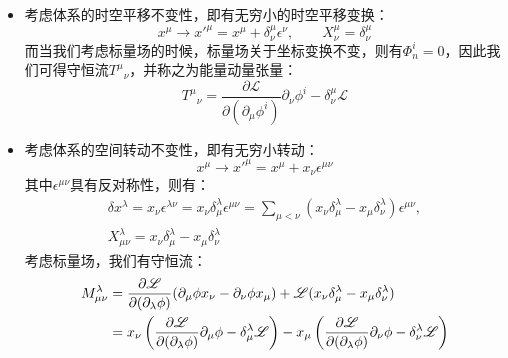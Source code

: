 \begin{itemize}
	\item 考虑体系的时空平移不变性，即有无穷小的时空平移变换：
	\begin{equation}
		x^\mu\rightarrow x'^\mu=x^\mu+\delta^\mu_\nu\epsilon^\nu,\qquad X^\mu_\nu=\delta^\mu_\nu
	\end{equation}
	而当我们考虑标量场的时候，标量场关于坐标变换不变，则有$\Phi^i_n=0$，因此我们可得守恒流${T^\mu}_\nu$，并称之为能量动量张量：
	\begin{equation}
		{T^\mu}_\nu=\frac{\partial\mathscr{L}}{\partial(\partial_\mu\phi^i)}\partial_\nu\phi^i-\delta^\mu_\nu\mathscr{L}
	\end{equation}
	\item 考虑体系的空间转动不变性，即有无穷小转动：
	\begin{equation}
		x^\mu\rightarrow x'^\mu=x^\mu+x_\nu\epsilon^{\mu\nu}
	\end{equation}
	其中$\epsilon^{\mu\nu}$具有反对称性，则有：
	\begin{gather}
		\delta x^\lambda=x_\nu\epsilon^{\lambda\nu}=x_\nu\delta^\lambda_\mu\epsilon^{\mu\nu}=\sum_{\mu<\nu}(x_\nu\delta^\lambda_\mu-x_\mu\delta^\lambda_\nu)\epsilon^{\mu\nu},\\
		X^\lambda_{\mu\nu}=x_\nu\delta^\lambda_\mu-x_\mu\delta^\lambda_\nu
	\end{gather}
	考虑标量场，我们有守恒流：
	\begin{align}
		M^\lambda_{\mu\nu}&=\frac{\partial\mathscr{L}}{\partial(\partial_\lambda\phi)}(\partial_\mu\phi x_\nu-\partial_\nu\phi x_\mu)+\mathscr{L}(x_\nu\delta^\lambda_\mu-x_\mu\delta^\lambda_\nu)\notag\\
		&=x_\nu\left(\frac{\partial\mathscr{L}}{\partial(\partial_\lambda\phi)}\partial_\mu\phi-\delta^\lambda_\mu\mathscr{L}\right)-x_\mu\left(\frac{\partial\mathscr{L}}{\partial(\partial_\lambda\phi)}\partial_\nu\phi-\delta^\lambda_\nu\mathscr{L}\right)

\end{align}
\end{itemize}

